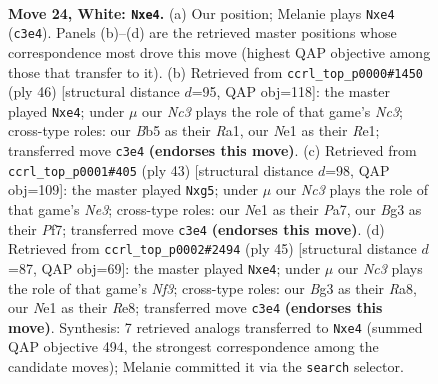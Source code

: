 \documentclass[11pt]{article}
\begin{document}
\clearpage

\begin{figure}[p]\centering
\begin{subfigure}{0.46\textwidth}\centering
\resizebox{\linewidth}{!}{%
\newchessgame
\chessboard[
  setfen={rnb3k1/5p2/1p2p3/1Bb4p/3rn3/2N3BP/PpR2PK1/1R2N3 w - - 0 24},
  showmover=false,
  pgfstyle=straightmove, color=movearrow, markmove={c3-e4}
]}
\caption{}
\end{subfigure}\hfill
\begin{subfigure}{0.46\textwidth}\centering
\resizebox{\linewidth}{!}{%
\newchessgame
\chessboard[
  setfen={2b1r1k1/5pb1/pn1B2p1/3P4/2B1n2p/2N1N2P/1r3PP1/R3R1K1 w - - 0 24},
  showmover=false,
  pgfstyle=straightmove, color=movearrow, markmove={c3-e4}
]}
\caption{}
\end{subfigure}
\\[4pt]
\begin{subfigure}{0.46\textwidth}\centering
\resizebox{\linewidth}{!}{%
\newchessgame
\chessboard[
  setfen={3r2k1/p4pp1/1p2nn2/6Np/4b3/4B1PP/PP3PB1/2R3K1 b - - 1 22},
  showmover=false,
  pgfstyle=straightmove, color=movearrow, markmove={e6-g5}
]}
\caption{}
\end{subfigure}\hfill
\begin{subfigure}{0.46\textwidth}\centering
\resizebox{\linewidth}{!}{%
\newchessgame
\chessboard[
  setfen={r3r1k1/5ppp/p4n2/1pR1bN2/4B3/4B2P/PP3PP1/3R3K b - - 0 23},
  showmover=false,
  pgfstyle=straightmove, color=movearrow, markmove={f6-e4}
]}
\caption{}
\end{subfigure}
\caption{\textbf{Move 24, White: \texttt{Nxe4}.} (a) Our position; Melanie plays \texttt{Nxe4} (\texttt{c3e4}). Panels (b)--(d) are the retrieved master positions whose correspondence most drove this move (highest QAP objective among those that transfer to it). (b) Retrieved from \texttt{ccrl\_top\_p0000\#1450} (ply 46) [structural distance $d$=95, QAP obj=118]: the master played \texttt{Nxe4}; under $\mu$ our \emph{Nc3} plays the role of that game's \emph{Nc3}; cross-type roles: our \emph{B}b5 as their \emph{R}a1, our \emph{N}e1 as their \emph{R}e1; transferred move \texttt{c3e4} \textbf{(endorses this move)}. (c) Retrieved from \texttt{ccrl\_top\_p0001\#405} (ply 43) [structural distance $d$=98, QAP obj=109]: the master played \texttt{Nxg5}; under $\mu$ our \emph{Nc3} plays the role of that game's \emph{Ne3}; cross-type roles: our \emph{N}e1 as their \emph{P}a7, our \emph{B}g3 as their \emph{P}f7; transferred move \texttt{c3e4} \textbf{(endorses this move)}. (d) Retrieved from \texttt{ccrl\_top\_p0002\#2494} (ply 45) [structural distance $d$=87, QAP obj=69]: the master played \texttt{Nxe4}; under $\mu$ our \emph{Nc3} plays the role of that game's \emph{Nf3}; cross-type roles: our \emph{B}g3 as their \emph{R}a8, our \emph{N}e1 as their \emph{R}e8; transferred move \texttt{c3e4} \textbf{(endorses this move)}. Synthesis: 7 retrieved analogs transferred to \texttt{Nxe4} (summed QAP objective 494, the strongest correspondence among the candidate moves); Melanie committed it via the \texttt{search} selector.}
\label{fig:thought-m46}
\end{figure}
\end{document}
